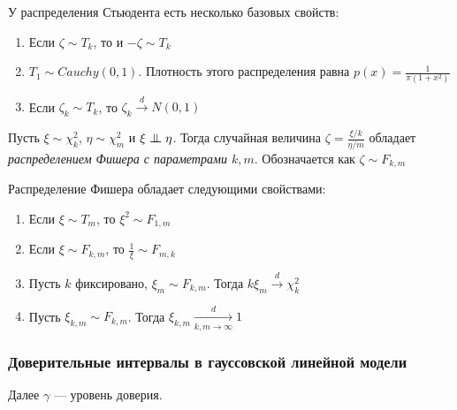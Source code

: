 \begin{proposition}
	У распределения Стьюдента есть несколько базовых свойств:
	\begin{enumerate}
		\item Если $\zeta \sim T_k$, то и $-\zeta \sim T_k$
		
		\item $T_1 \sim Cauchy(0, 1)$. Плотность этого распределения равна $p(x) = \frac{1}{\pi(1 + x^2)}$
		
		\item Если $\zeta_k \sim T_k$, то $\zeta_k \xrightarrow{d} N(0, 1)$
	\end{enumerate}
\end{proposition}

\begin{definition}
	Пусть $\xi \sim \chi_k^2$, $\eta \sim \chi_m^2$ и $\xi \perp\mkern-9.5mu\perp \eta$. Тогда случайная величина $\zeta = \frac{\xi / k}{\eta / m}$ обладает \textit{распределением Фишера с параметрами $k, m$}. Обозначается как $\zeta \sim F_{k, m}$
\end{definition}

\begin{proposition}
	Распределение Фишера обладает следующими свойствами:
	\begin{enumerate}
		\item Если $\xi \sim T_m$, то $\xi^2 \sim F_{1, m}$
		
		\item Если $\xi \sim F_{k, m}$, то $\frac{1}{\xi} \sim F_{m, k}$
		
		\item Пусть $k$ фиксировано, $\xi_m \sim F_{k, m}$. Тогда $k\xi_m \xrightarrow{d} \chi_k^2$
		
		\item Пусть $\xi_{k, m} \sim F_{k, m}$. Тогда $\xi_{k, m} \xrightarrow[k, m \to \infty]{d} 1$
	\end{enumerate}
\end{proposition}

\subsubsection{Доверительные интервалы в гауссовской линейной модели}

Далее $\gamma$ --- уровень доверия.

